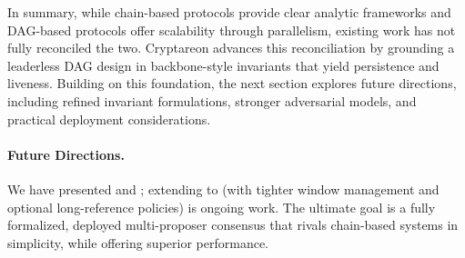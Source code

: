 In summary, while chain-based protocols provide clear analytic frameworks and DAG-based
protocols offer scalability through parallelism, existing work has not fully reconciled the two.
Cryptareon advances this reconciliation by grounding a leaderless DAG design in backbone-style
invariants that yield persistence and liveness. Building on this foundation, the next section
explores future directions, including refined invariant formulations, stronger adversarial models,
and practical deployment considerations.


\paragraph{Future Directions.} We have presented \ProjIdeal and \ProjBase; extending to \ProjFull (with tighter window management and optional long-reference policies) is ongoing work. The ultimate goal is a fully formalized, deployed multi-proposer consensus that rivals chain-based systems in simplicity, while offering superior performance.



